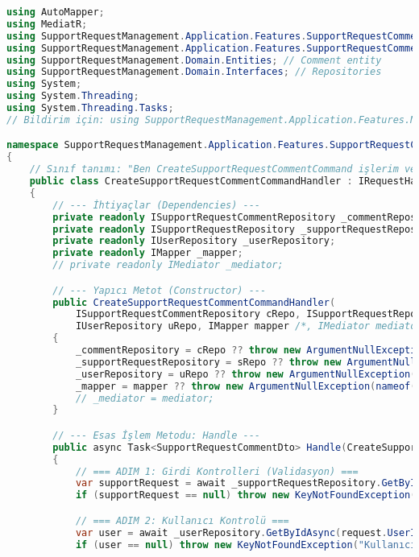 \documentclass[11pt, a4paper]{article}
\begin{document}
\begin{lstlisting}[language=C#]
using AutoMapper;
using MediatR;
using SupportRequestManagement.Application.Features.SupportRequestComment.Commands;
using SupportRequestManagement.Application.Features.SupportRequestComment.Dtos;
using SupportRequestManagement.Domain.Entities; // Comment entity
using SupportRequestManagement.Domain.Interfaces; // Repositories
using System;
using System.Threading;
using System.Threading.Tasks;
// Bildirim için: using SupportRequestManagement.Application.Features.Notification.Commands;

namespace SupportRequestManagement.Application.Features.SupportRequestComment.Handlers
{
    // Sınıf tanımı: "Ben CreateSupportRequestCommentCommand işlerim ve SupportRequestCommentDto döndürürüm."
    public class CreateSupportRequestCommentCommandHandler : IRequestHandler<CreateSupportRequestCommentCommand, SupportRequestCommentDto>
    {
        // --- İhtiyaçlar (Dependencies) ---
        private readonly ISupportRequestCommentRepository _commentRepository; 
        private readonly ISupportRequestRepository _supportRequestRepository; 
        private readonly IUserRepository _userRepository; 
        private readonly IMapper _mapper; 
        // private readonly IMediator _mediator; 

        // --- Yapıcı Metot (Constructor) ---
        public CreateSupportRequestCommentCommandHandler(
            ISupportRequestCommentRepository cRepo, ISupportRequestRepository sRepo, 
            IUserRepository uRepo, IMapper mapper /*, IMediator mediator */)
        {
            _commentRepository = cRepo ?? throw new ArgumentNullException(nameof(cRepo));
            _supportRequestRepository = sRepo ?? throw new ArgumentNullException(nameof(sRepo));
            _userRepository = uRepo ?? throw new ArgumentNullException(nameof(uRepo));
            _mapper = mapper ?? throw new ArgumentNullException(nameof(mapper));
            // _mediator = mediator;
        }

        // --- Esas İşlem Metodu: Handle ---
        public async Task<SupportRequestCommentDto> Handle(CreateSupportRequestCommentCommand request, CancellationToken cancellationToken)
        {
            // === ADIM 1: Girdi Kontrolleri (Validasyon) ===
            var supportRequest = await _supportRequestRepository.GetByIdAsync(request.SupportRequestId);
            if (supportRequest == null) throw new KeyNotFoundException("Destek talebi bulunamadı.");

            // === ADIM 2: Kullanıcı Kontrolü ===
            var user = await _userRepository.GetByIdAsync(request.UserId);
            if (user == null) throw new KeyNotFoundException("Kullanıcı bulunamadı.");
            

\end{lstlisting}
\end{document}
